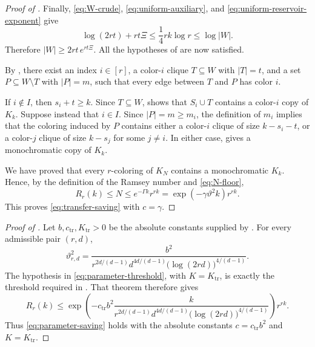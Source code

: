 \documentclass[twoside,12pt]{article}
\theoremstyle{definition}
\theoremstyle{remark}
\newcommand{\1}{\mathbf 1}
\begin{document}
\begin{proof}[Proof of ]
Finally, \eqref{eq:W-crude}, \eqref{eq:uniform-auxiliary}, and
\eqref{eq:uniform-reservoir-exponent} give
\[
 \log(2rt)+rt\Xi
 \le\frac14rk\log r
 \le\log|W|.
\]
Therefore
$
 |W|\ge2rt\,e^{rt\Xi}.
$
All the hypotheses of  are now satisfied.

By , there exist an index $i\in[r]$, a color-$i$ clique
$T\subseteq W$ with $|T|=t$, and a set
$
 P\subseteq W\setminus T$ with
 $|P|=m$,
such that every edge between $T$ and $P$ has color $i$.

If $i\notin I$, then $s_i+t\ge k$. Since $T\subseteq W$,
 shows that $S_i\cup T$ contains a color-$i$
copy of $K_k$. Suppose instead that $i\in I$. Since $|P|=m\ge m_i$, the
definition of $m_i$ implies that the coloring induced by $P$ contains either
a color-$i$ clique of size $k-s_i-t$, or a color-$j$ clique of size
$k-s_j$ for some $j\ne i$. In either case,
 gives a monochromatic copy of $K_k$.

We have proved that every $r$-coloring of $K_N$ contains a monochromatic
$K_k$. Hence, by the definition of the Ramsey number and
\eqref{eq:N-floor},
\[
 R_r(k)\le N
 \le e^{-\Gamma k}r^{rk}
 =\exp(-\gamma\vartheta^2k)r^{rk}.
\]
This proves \eqref{eq:transfer-saving} with $c=\gamma$.
\end{proof}

\begin{proof}[Proof of ]
Let $b,c_{\mathrm{tr}},K_{\mathrm{tr}}>0$ be the absolute constants supplied
by . For every admissible pair $(r,d)$,
\[
 \vartheta_{r,d}^2
 =\frac{b^2}{
 r^{2d/(d-1)}d^{4d/(d-1)}
 \bigl(\log(2rd)\bigr)^{4/(d-1)}}.
\]
The hypothesis in \eqref{eq:parameter-threshold}, with
$K=K_{\mathrm{tr}}$, is exactly the threshold required in
. That theorem therefore gives
\[
 R_r(k)\le
 \exp\!\left(
 -c_{\mathrm{tr}}b^2\frac{k}{
 r^{2d/(d-1)}d^{4d/(d-1)}
 \bigl(\log(2rd)\bigr)^{4/(d-1)}}
 \right)r^{rk}.
\]
Thus \eqref{eq:parameter-saving} holds with the absolute constants
$c=c_{\mathrm{tr}}b^2$ and $K=K_{\mathrm{tr}}$.
\end{proof}
\end{document}

